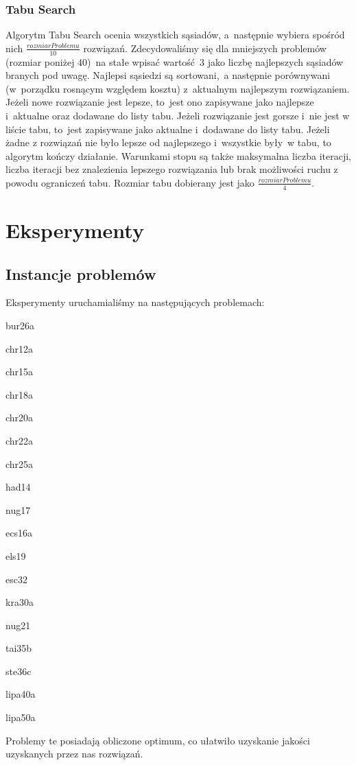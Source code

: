 \documentclass[a4paper,10pt]{article}
\begin{document}
\subsubsection{Tabu Search}
Algorytm Tabu Search ocenia wszystkich sąsiadów, a~następnie wybiera spośród nich $\frac{rozmiarProblemu}{10}$ rozwiązań. 
Zdecydowaliśmy się dla mniejszych problemów (rozmiar poniżej 40)~na stałe wpisać wartość~3 jako liczbę najlepszych sąsiadów branych pod uwagę.
Najlepsi sąsiedzi są sortowani,~a następnie porównywani (w~porządku rosnącym względem kosztu) z~aktualnym najlepszym rozwiązaniem.
Jeżeli nowe rozwiązanie jest lepsze, to~jest ono zapisywane jako najlepsze i~aktualne oraz dodawane do listy tabu.
Jeżeli rozwiązanie jest gorsze i~nie jest w liście tabu, to~jest zapisywane jako aktualne i~dodawane do listy tabu.
Jeżeli żadne z rozwiązań nie było lepsze od najlepszego i~wszystkie były~w tabu, to algorytm kończy działanie.
Warunkami stopu są także maksymalna liczba iteracji, liczba iteracji bez znalezienia lepszego rozwiązania lub brak możliwości ruchu z powodu ograniczeń tabu.
Rozmiar tabu dobierany jest jako $\frac{rozmiarProblemu}{4}$.

\section{Eksperymenty}
\subsection{Instancje problemów}
Eksperymenty uruchamialiśmy na następujących problemach:
\begin{tightenum}
\item bur26a
\item chr12a
\item chr15a
\item chr18a
\item chr20a
\item chr22a
\item chr25a
\item had14
\item nug17
\item ecs16a
\item els19
\item esc32
\item kra30a
\item nug21
\item tai35b
\item ste36c
\item lipa40a
\item lipa50a
\end{tightenum}
Problemy te posiadają obliczone optimum, co ułatwiło uzyskanie jakości uzyskanych przez nas rozwiązań.
\end{document}
